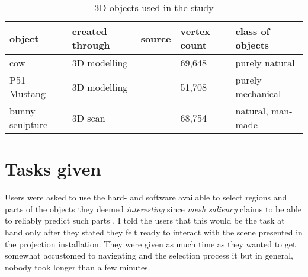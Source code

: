 \begin{table}[]
\centering
	\begin{tabular}{l|l|l|l|l}
		object	& created through	& source	& vertex count	& class of objects	\\ \hline
		cow	& 3D modelling		& \cite{cow}	& 69,648	& purely natural	\\
		P51 Mustang	&	3D modelling	& \cite{P51}	& 51,708	& purely mechanical	\\
		bunny sculpture	&	3D scan	& \cite{bun}	& 68,754	& natural, man-made	
	\end{tabular}
	\caption{3D objects used in the study}
	\label{tab:userstudy_objects}
\end{table}

	\section{Tasks given}
	\label{sec:tasks_given}
%
%

Users were asked to use the hard- and software available to select regions and parts of the objects they deemed \textit{interesting} since \textit{mesh saliency} claims to be able to reliably predict such parts \cite{lee2005mesh}. I told the users that this would be the task at hand only after they stated they felt ready to interact with the scene presented in the projection installation. They were given as much time as they wanted to get somewhat accustomed to navigating and the selection process it but in general, nobody took longer than a few minutes.


